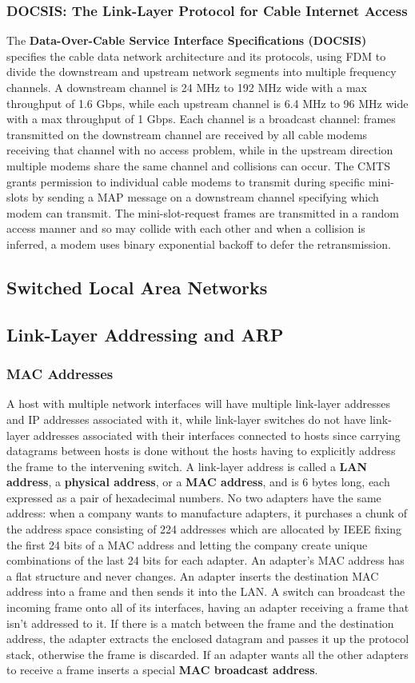\documentclass{article}
\begin{document}
\subsubsection{DOCSIS: The Link-Layer Protocol for Cable Internet Access}
The \textbf{Data-Over-Cable Service Interface Specifications (DOCSIS)} specifies the cable data network architecture and its protocols, using FDM to divide the downstream and upstream network segments into multiple frequency channels. A downstream channel is 24 MHz to 192 MHz wide with a max throughput of 1.6 Gbps, while each upstream channel is 6.4 MHz to 96 MHz wide with a max throughput of 1 Gbps. Each channel is a broadcast channel: frames transmitted on the downstream channel are received by all cable modems receiving that channel with no access problem, while in the upstream direction multiple modems share the same channel and collisions can occur. The CMTS grants permission to individual cable modems to transmit during specific mini-slots by sending a MAP message on a downstream channel specifying which modem can transmit. The mini-slot-request frames are transmitted in a random access manner and so may collide with each other and when a collision is inferred, a modem uses binary exponential backoff to defer the retransmission.

\subsection{Switched Local Area Networks}
\subsection{Link-Layer Addressing and ARP}
\subsubsection*{MAC Addresses}
A host with multiple network interfaces will have multiple link-layer addresses and IP addresses associated with it, while link-layer switches do not have link-layer addresses associated with their interfaces connected to hosts since carrying datagrams between hosts is done without the hosts having to explicitly address the frame to the intervening switch.
A link-layer address is called a \textbf{LAN address}, a \textbf{physical address}, or a \textbf{MAC address}, and is 6 bytes long, each expressed as a pair of hexadecimal numbers.
No two adapters have the same address: when a company wants to manufacture adapters, it purchases a chunk of the address space consisting of 224 addresses which are allocated by IEEE fixing the first 24 bits of a MAC address and letting the company create unique combinations of the last 24 bits for each adapter. 
An adapter’s MAC address has a flat structure and never changes.
An adapter inserts the destination MAC address into a frame and then sends it into the LAN.
A switch can broadcast the incoming frame onto all of its interfaces, having an adapter receiving a frame that isn’t addressed to it.
If there is a match between the frame and the destination address, the adapter extracts the enclosed datagram and passes it up the protocol stack, otherwise the frame is discarded.
If an adapter wants all the other adapters to receive a frame inserts a special \textbf{MAC broadcast address}.
\end{document}
